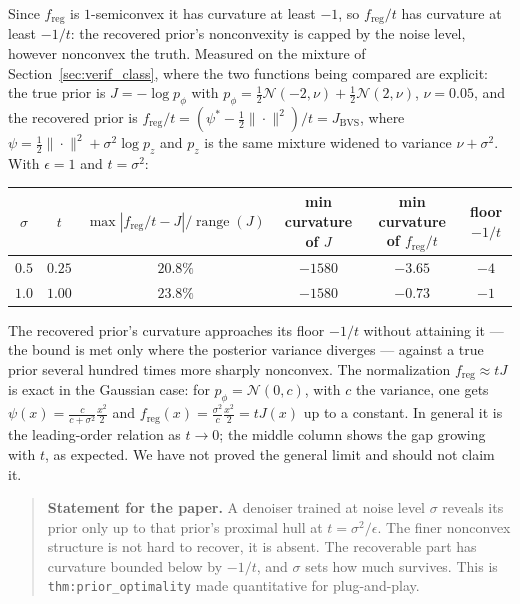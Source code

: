 \documentclass[11pt]{article}
\theoremstyle{definition}
\newcommand{\freg}{f_{\mathrm{reg}}}
\newcommand{\code}[1]{\texttt{#1}}
\newcommand{\Jbvs}{J_{\mathrm{BVS}}}
\begin{document}
Since $\freg$ is $1$-semiconvex it has curvature at least $-1$, so $\freg/t$ has curvature at least $-1/t$: the recovered prior's nonconvexity is capped by the noise level, however nonconvex the truth. Measured on the mixture of Section~\ref{sec:verif_class}, where the two functions being compared are explicit: the true prior is $J = -\log p_\phi$ with $p_\phi = \tfrac12\mathcal{N}(-2,\nu) + \tfrac12\mathcal{N}(2,\nu)$, $\nu = 0.05$, and the recovered prior is $\freg/t = (\psi^* - \tfrac12\|\cdot\|^2)/t = \Jbvs$, where $\psi = \tfrac12\|\cdot\|^2 + \sigma^2\log p_z$ and $p_z$ is the same mixture widened to variance $\nu + \sigma^2$. With $\epsilon=1$ and $t=\sigma^2$:

\begin{center}
\begin{tabular}{cccccc}
\toprule
$\sigma$ & $t$ & $\max|\freg/t - J| / \operatorname{range}(J)$ & min curvature of $J$ & min curvature of $\freg/t$ & floor $-1/t$ \\
\midrule
$0.5$ & $0.25$ & $20.8\%$ & $-1580$ & $-3.65$ & $-4$ \\
$1.0$ & $1.00$ & $23.8\%$ & $-1580$ & $-0.73$ & $-1$ \\
\bottomrule
\end{tabular}
\end{center}

The recovered prior's curvature approaches its floor $-1/t$ without attaining it — the bound is met only where the posterior variance diverges — against a true prior several hundred times more sharply nonconvex. The normalization $\freg\approx tJ$ is exact in the Gaussian case: for $p_\phi = \mathcal{N}(0,c)$, with $c$ the variance, one gets $\psi(x) = \tfrac{c}{c+\sigma^2}\tfrac{x^2}{2}$ and $\freg(x) = \tfrac{\sigma^2}{c}\tfrac{x^2}{2} = tJ(x)$ up to a constant. In general it is the leading-order relation as $t\to0$; the middle column shows the gap growing with $t$, as expected. We have not proved the general limit and should not claim it.

\begin{quote}
\textbf{Statement for the paper.} A denoiser trained at noise level $\sigma$ reveals its prior only up to that prior's proximal hull at $t=\sigma^2/\epsilon$. The finer nonconvex structure is not hard to recover, it is absent. The recoverable part has curvature bounded below by $-1/t$, and $\sigma$ sets how much survives. This is \code{thm:prior\_optimality} made quantitative for plug-and-play.
\end{quote}
\end{document}
